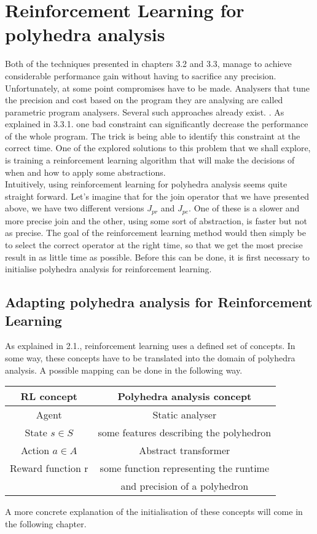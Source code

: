 \section{Reinforcement Learning for polyhedra analysis}
Both of the techniques presented in chapters 3.2 and 3.3, manage to achieve considerable performance gain without having to sacrifice any precision. Unfortunately, at some point compromises have to be made. Analysers that tune the precision and cost based on the program they are analysing are called parametric program analysers. Several such approaches already exist. \cite{oh2015learning,liang2011learning,heo2016learning}.
As explained in 3.3.1. one bad constraint can significantly decrease the performance of the whole program. The trick is being able to identify this constraint at the correct time. One of the explored solutions to this problem that we shall explore, is training a reinforcement learning algorithm  that will make the decisions of when and how to apply some abstractions\cite{singh2018fast}.\\
Intuitively, using reinforcement learning for polyhedra analysis seems quite straight forward. Let's imagine that for the join operator that we have presented above, we have two different versions $J_{pr}$ and $J_{pe}$. One of these is a slower and more precise join and the other, using some sort of abstraction, is faster but not as precise. The goal of the reinforcement learning method would then simply be to select the correct operator at the right time, so that we get the most precise result in as little time as possible. Before this can be done, it is first necessary to initialise polyhedra analysis for reinforcement learning.

\subsection{Adapting polyhedra analysis for Reinforcement Learning}
As explained in 2.1., reinforcement learning uses a defined set of concepts. In some way, these concepts have to be translated into the domain of polyhedra analysis. A possible mapping can be done in the following way.
\begin{center}
\begin{tabular}{||c c||} 
 \hline
 RL concept & Polyhedra analysis concept  \\ [0.5ex] 
 \hline
 \hline
 Agent & Static analyser\\ 

 State $s\in S$ & some features describing the polyhedron\\

 Action $a \in A$ & Abstract transformer \\
 
 Reward function r & some function representing the runtime\\
 
  & and precision of a polyhedron\\
 \hline
\end{tabular}
\end{center}
A more concrete explanation of the initialisation of these concepts will come in the following chapter.

